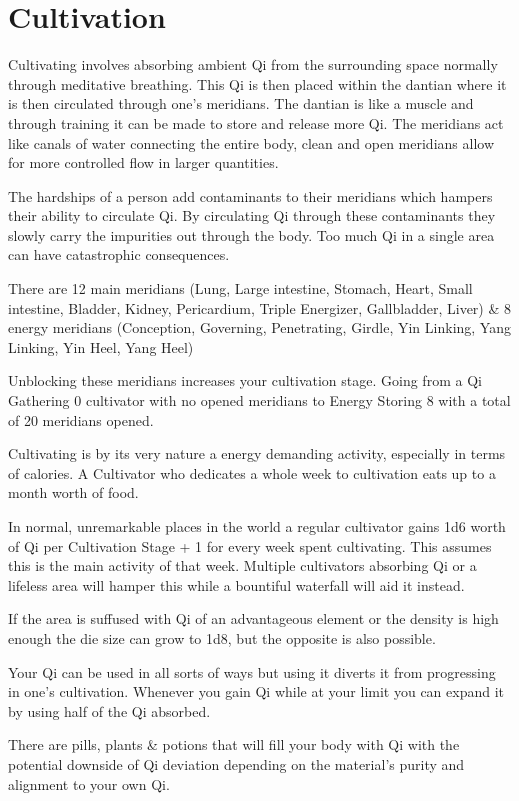 \section{Cultivation}
Cultivating involves absorbing ambient Qi from the surrounding space normally through meditative breathing. This Qi is then placed within the dantian where it is then circulated through one's meridians. The dantian is like a muscle and through training it can be made to store and release more Qi. The meridians act like canals of water connecting the entire body, clean and open meridians allow for more controlled flow in larger quantities. 

The hardships of a person add contaminants to their meridians which hampers their ability to circulate Qi. By circulating Qi through these contaminants they slowly carry the impurities out through the body. Too much Qi in a single area can have catastrophic consequences. 

There are 12 main meridians (Lung, Large intestine, Stomach, Heart, Small intestine, Bladder, Kidney, Pericardium, Triple Energizer, Gallbladder, Liver) \& 8 energy meridians (Conception, Governing, Penetrating, Girdle, Yin Linking, Yang Linking, Yin Heel, Yang Heel)

Unblocking these meridians increases your cultivation stage. Going from a Qi Gathering 0 cultivator with no opened meridians to Energy Storing 8 with a total of 20 meridians opened.

Cultivating is by its very nature a energy demanding activity, especially in terms of calories. A Cultivator who dedicates a whole week to cultivation eats up to a month worth of food.

In normal, unremarkable places in the world a regular cultivator gains 1d6 worth of Qi per Cultivation Stage + 1 for every week spent cultivating. This assumes this is the main activity of that week. Multiple cultivators absorbing Qi or a lifeless area will hamper this while a bountiful waterfall will aid it instead.

If the area is suffused with Qi of an advantageous element or the density is high enough the die size can grow to 1d8, but the opposite is also possible.

Your Qi can be used in all sorts of ways but using it diverts it from progressing in one's cultivation. Whenever you gain Qi while at your limit you can expand it by using half of the Qi absorbed.

There are pills, plants \& potions that will fill your body with Qi with the potential downside of Qi deviation depending on the material's purity and alignment to your own Qi.

